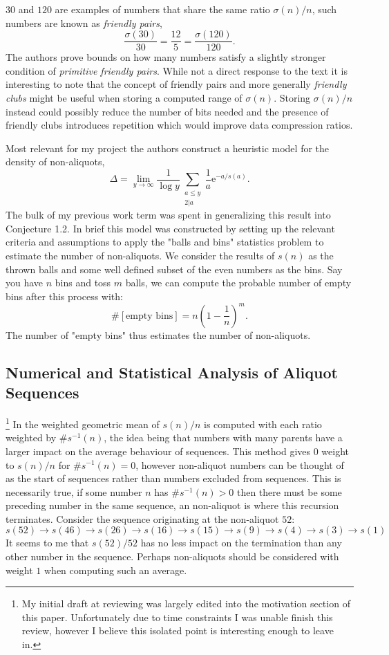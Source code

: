 \documentclass{article}
\theoremstyle{definition}
\begin{document}
$30$ and $120$ are examples of numbers that share the same ratio $\sigma(n)/n$, such numbers are known as \textit{friendly pairs},
$$\frac{\sigma(30)}{30} = \frac{12}{5} = \frac{\sigma(120)}{120}.$$
The authors prove bounds on how many numbers satisfy a slightly stronger condition of \textit{primitive friendly pairs}. While not a direct response to the text it is interesting to note that the concept of friendly pairs and more generally \textit{friendly clubs} might be useful when storing a computed range of $\sigma(n)$. Storing $\sigma(n)/n$ instead could possibly reduce the number of bits needed and the presence of friendly clubs introduces repetition which would improve data compression ratios.

Most relevant for my project the authors construct a heuristic model for the density of non-aliquots,
$$\Delta = \lim_{y \to \infty}\frac{1}{\log y} \sum_{\substack{a\leq y \\ 2 | a}} \frac{1}{a}\text{e}^{-a/s(a)}.$$
The bulk of my previous work term was spent in generalizing this result into Conjecture 1.2. In brief this model was constructed by setting up the relevant criteria and assumptions to apply the "balls and bins" statistics problem to estimate the number of non-aliquots. We consider the results of $s(n)$ as the thrown balls and some well defined subset of the even numbers as the bins. Say you have $n$ bins and toss $m$ balls, we can compute the probable number of empty bins after this process with: $$\# [\text{empty bins}] = n(1- \frac{1}{n})^m.$$
The number of "empty bins" thus estimates the number of non-aliquots.
%
\subsection{Numerical and Statistical Analysis of Aliquot Sequences}
\label{sec:chumetal}
\footnote{My initial draft at reviewing \cite{chum_guy_jacobson_mosunov_2018} was largely edited into the motivation section of this paper. Unfortunately due to time constraints I was unable finish this review, however I believe this isolated point is interesting enough to leave in.}
In \cite{chum_guy_jacobson_mosunov_2018} the weighted geometric mean of $s(n)/n$ is computed with each ratio weighted by $\#s^{-1}(n)$, the idea being that numbers with many parents have a larger impact on the average behaviour of sequences. This method gives $0$ weight to $s(n)/n$ for $\#s^{-1}(n) = 0$, however non-aliquot numbers can be thought of as the start of sequences rather than numbers excluded from sequences. This is necessarily true, if some number $n$ has $\#s^{-1}(n) > 0$ then there must be some preceding number in the same sequence, an non-aliquot is where this recursion terminates. Consider the sequence originating at the non-aliquot $52$: 
$$s(52) \to s(46) \to s(26) \to s(16) \to s(15) \to s(9) \to s(4) \to s(3) \to s(1)$$It seems to me that $s(52)/52$ has no less impact on the termination than any other number in the sequence. Perhaps non-aliquots should be considered with weight $1$ when computing such an average.
%
\end{document}
